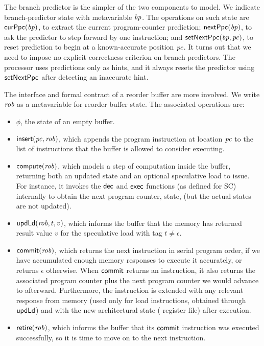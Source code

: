 The branch predictor is the simpler of the two components to model.
We indicate branch-predictor state with metavariable $\mathit{bp}$.
The operations on such state are $\mathsf{curPpc}(\mathit{bp})$, to extract the
current program-counter prediction; $\mathsf{nextPpc}(\mathit{bp})$, to ask the
predictor to step forward by one instruction; and $\mathsf{setNextPpc}(\mathit{bp}, \mathit{pc})$,
to reset prediction to begin at a known-accurate position $\mathit{pc}$.  It
turns out that we need to impose no explicit correctness criterion on
branch predictors.  The processor uses predictions only as hints, and
it always resets the predictor using $\mathsf{setNextPpc}$ after detecting an
inaccurate hint.

The interface and formal contract of a reorder buffer are more
involved.  We write $\mathit{rob}$ as a metavariable for reorder buffer
state.  The associated operations are:
\begin{itemize}
\item $\phi$, the state of an empty buffer.
\item $\mathsf{insert}(\mathit{pc}, \mathit{rob})$, which appends the program instruction at location $\mathit{pc}$ to the list of instructions that the buffer is allowed to consider executing.
\item $\mathsf{compute}(\mathit{rob})$, which models a
step of computation inside the buffer, returning both an updated state
and an optional speculative load to issue. For instance, it invokes the $\mathsf{dec}$
and $\mathsf{exec}$ functions (as defined for SC) internally to obtain the next program
counter, state, \etc{} (but the actual states are not updated).
\item $\mathsf{upd}\mathsf{Ld}(\mathit{rob},t,v)$, which informs the buffer that the memory
has returned result value $v$ for the speculative load with tag $t \neq \epsilon$.
\item $\mathsf{commit}(\mathit{rob})$, which returns the next instruction in serial
program order, if we have accumulated enough memory responses to execute it
accurately, or returns
$\epsilon$ otherwise.  When $\mathsf{commit}$ returns an instruction, it also
returns the associated program counter plus the next program counter
we would advance to afterward.
 Furthermore, the instruction is
extended with any relevant response from memory (used only for load
instructions, obtained through $\mathsf{upd}\mathsf{Ld}$) and with the new architectural state (\eg{} register
file) after execution.
\item $\mathsf{retire}(\mathit{rob})$, which informs the buffer that its $\mathsf{commit}$
instruction was executed successfully, so it is time to move on to the
next instruction.
\end{itemize}

